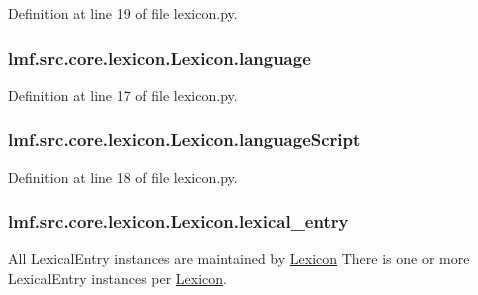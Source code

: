 Definition at line 19 of file lexicon.\+py.

\hypertarget{classlmf_1_1src_1_1core_1_1lexicon_1_1_lexicon_a17a5f90d6242843af84f145aea4dfe76}{
\subsubsection[{language}]{\setlength{\rightskip}{0pt plus 5cm}lmf.\+src.\+core.\+lexicon.\+Lexicon.\+language}}\label{classlmf_1_1src_1_1core_1_1lexicon_1_1_lexicon_a17a5f90d6242843af84f145aea4dfe76}


Definition at line 17 of file lexicon.\+py.

\hypertarget{classlmf_1_1src_1_1core_1_1lexicon_1_1_lexicon_a33c93912a6bedb0eb095cf85245d6051}{
\subsubsection[{language\+Script}]{\setlength{\rightskip}{0pt plus 5cm}lmf.\+src.\+core.\+lexicon.\+Lexicon.\+language\+Script}}\label{classlmf_1_1src_1_1core_1_1lexicon_1_1_lexicon_a33c93912a6bedb0eb095cf85245d6051}


Definition at line 18 of file lexicon.\+py.

\hypertarget{classlmf_1_1src_1_1core_1_1lexicon_1_1_lexicon_a548b2adbf028d9058dd4676cc00d2ee1}{
\subsubsection[{lexical\+\_\+entry}]{\setlength{\rightskip}{0pt plus 5cm}lmf.\+src.\+core.\+lexicon.\+Lexicon.\+lexical\+\_\+entry}}\label{classlmf_1_1src_1_1core_1_1lexicon_1_1_lexicon_a548b2adbf028d9058dd4676cc00d2ee1}


All Lexical\+Entry instances are maintained by \hyperlink{classlmf_1_1src_1_1core_1_1lexicon_1_1_lexicon}{Lexicon} There is one or more Lexical\+Entry instances per \hyperlink{classlmf_1_1src_1_1core_1_1lexicon_1_1_lexicon}{Lexicon}. 



